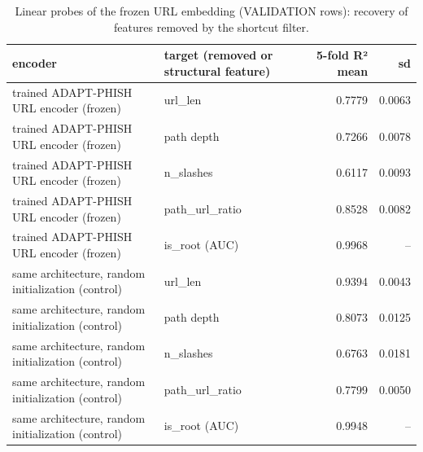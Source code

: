 \begin{table}[t]
\centering
\scriptsize
\caption{Linear probes of the frozen URL embedding (VALIDATION rows): recovery of features removed by the shortcut filter.}
\label{tab:rev_R8_probe_url_embedding}
\begin{tabular}{llrr}
\toprule
encoder & target (removed or structural feature) & 5-fold R² mean & sd \\
\midrule
trained ADAPT-PHISH URL encoder (frozen) & url\_len & 0.7779 & 0.0063 \\
trained ADAPT-PHISH URL encoder (frozen) & path depth & 0.7266 & 0.0078 \\
trained ADAPT-PHISH URL encoder (frozen) & n\_slashes & 0.6117 & 0.0093 \\
trained ADAPT-PHISH URL encoder (frozen) & path\_url\_ratio & 0.8528 & 0.0082 \\
trained ADAPT-PHISH URL encoder (frozen) & is\_root (AUC) & 0.9968 & -- \\
same architecture, random initialization (control) & url\_len & 0.9394 & 0.0043 \\
same architecture, random initialization (control) & path depth & 0.8073 & 0.0125 \\
same architecture, random initialization (control) & n\_slashes & 0.6763 & 0.0181 \\
same architecture, random initialization (control) & path\_url\_ratio & 0.7799 & 0.0050 \\
same architecture, random initialization (control) & is\_root (AUC) & 0.9948 & -- \\
\bottomrule
\end{tabular}
\end{table}